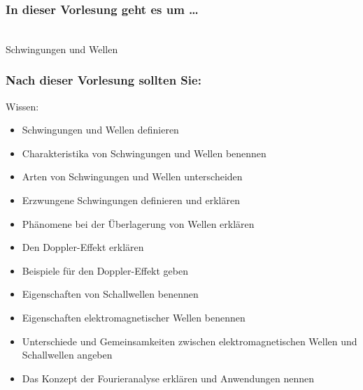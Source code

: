 \documentclass{beamer}
\begin{document}
{
  
\begin{frame}[plain]

\frametitle{In dieser Vorlesung geht es um \dots}

$\,$\\[5cm]


\Large{Schwingungen und Wellen}


 
\end{frame}
}




 
\begin{frame}

\frametitle{Nach dieser Vorlesung sollten Sie:}



\begin{block}{Wissen:}
\begin{itemize}
\item
Schwingungen und Wellen definieren
\item
Charakteristika von Schwingungen und Wellen benennen 
\item
Arten von Schwingungen und Wellen unterscheiden
\item
Erzwungene Schwingungen definieren und erklären
\item
Phänomene bei der Überlagerung von Wellen erklären
\item
Den Doppler-Effekt erklären
\item
Beispiele für den Doppler-Effekt geben
\item
Eigenschaften von Schallwellen benennen
\item
Eigenschaften elektromagnetischer Wellen benennen
\item
Unterschiede und Gemeinsamkeiten zwischen elektromagnetischen Wellen und Schallwellen angeben
\item
Das Konzept der Fourieranalyse erklären und Anwendungen nennen
\end{itemize}

\end{block}

\end{frame}
\end{document}
